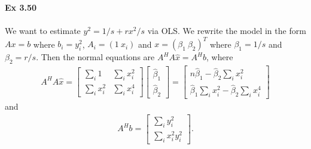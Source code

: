 \documentclass[letterpaper,12pt]{article}
\theoremstyle{definition}
\begin{document}
\begin{spacing}{1.3}{}
	\textbf{Ex 3.50} \\\\
	We want to estimate $y^2=1/s+rx^2/s$ via OLS.
	We rewrite the model in the form $Ax=b$ where
	$b_i=y_i^2$, $A_i=(1\ x_i)$ and $x=(\beta_1\ \beta_2)^T$ where $\beta_1=1/s$ and $\beta_2=r/s$.
	Then the normal equations are $A^HA\hat{x}=A^Hb$, where
	\begin{align*}
	A^HA\hat{x} =
	\begin{bmatrix}
	\sum_i 1 & \sum_ix_i^2\\
	\sum_ix_i^2& \sum_ix_i^4
	\end{bmatrix}
	\begin{bmatrix}
	\hat{\beta}_1\\ \hat{\beta}_2
	\end{bmatrix} =
	\begin{bmatrix}
	n\hat{\beta}_1 - \hat{\beta}_2\sum_i x_i^2\\
	\hat{\beta}_1\sum_ix_i^2 - \hat{\beta}_2\sum_ix_i^4
	\end{bmatrix}
	\end{align*}
	and
	\begin{align*}
	A^Hb=
	\begin{bmatrix}
	\sum_i y_i^2\\
	\sum_i x_i^2y_i^2
	\end{bmatrix}.
	\end{align*}
	
	

 \end{spacing}
\end{document}
